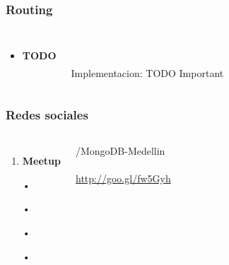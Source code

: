 \documentclass{beamer}
\begin{document}
\begin{frame}
\frametitle{Routing}
\begin{columns}[c]
\begin{itemize}
\item \textbf{TODO}
\end{itemize}

\\~\\
Implementacion: TODO Important
\end{columns}
\end{frame}
\begin{frame}
\frametitle{Redes sociales}
\begin{columns}[c] %

\begin{enumerate}
\item \textbf{Meetup}
\item[•]	
\item[•]	
\item[•]	
\item[•]	
\end{enumerate}

{\color{blue}/MongoDB-Medellin}
\\~\\
{\color{blue}\url{http://goo.gl/fw5Gyh}}
\end{columns}
\end{frame}
\end{document}
